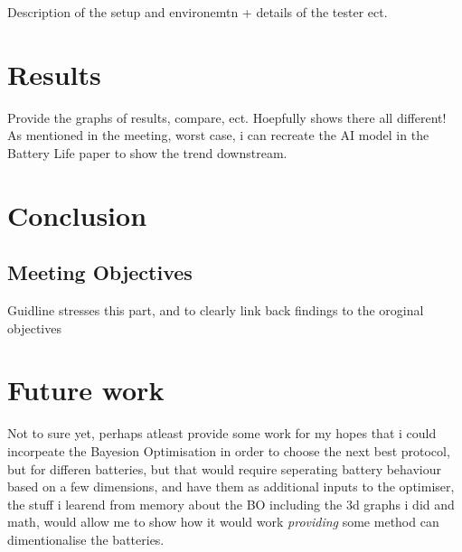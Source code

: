 \documentclass[12pt]{article}
\begin{document}
Description of the setup and environemtn + details of the tester ect. 

\section{Results}
Provide the graphs of results, compare, ect. Hoepfully shows there all different!  As mentioned in the meeting, worst case, i can recreate the AI model in the Battery Life paper to show the trend downstream. 

\section{Conclusion}

\subsection{Meeting Objectives}

Guidline stresses this part, and to clearly link back findings to the oroginal objectives

\section{Future work}

Not to sure yet, perhaps atleast provide some work for my hopes that i could incorpeate the Bayesion Optimisation in order to choose the next best protocol, but for differen batteries, but that would require seperating battery behaviour based on a few dimensions, and have them as additional inputs to the optimiser, the stuff i learend from memory about the BO including the 3d graphs i did and math, would allow me to show how it would work \textit{providing} some method can dimentionalise the batteries.
\end{document}
